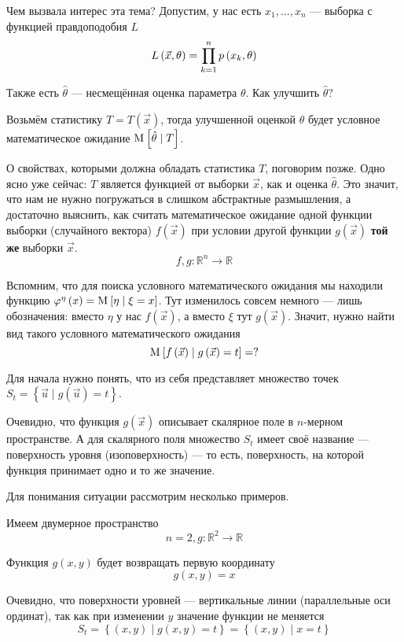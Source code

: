 Чем вызвала интерес эта тема?
Допустим, у нас есть $x_1, \dots, x_n$ --- выборка с функцией правдоподобия $L$
$$L\left( \vec{x}, \theta \right) = \prod_{k=1}^n p\left(x_k, \theta\right)$$

Также есть $\hat{\theta}$ --- несмещённая оценка параметра $\theta$.
Как улучшить $\hat{\theta}$?

Возьмём статистику $T = T\left( \vec{x} \right)$,
тогда улучшенной оценкой $\theta$ будет условное математическое ожидание
$\mathrm{M}_{} \left[  \hat{\theta} \mid T  \right]$.

О свойствах, которыми должна обладать статистика $T$, поговорим позже.
Одно ясно уже сейчас: $T$ является функцией от выборки $\vec{x}$,
как и оценка $\hat{\theta}$.
Это значит, что нам не нужно погружаться в слишком абстрактные размышления,
а достаточно выяснить, как считать математическое ожидание
одной функции выборки (случайного вектора) $f\left( \vec{x} \right)$
при условии другой функции $g\left( \vec{x} \right)$
\textbf{той же} выборки $\vec{x}$.
$$f,g: \mathbb{R}^n \rightarrow \mathbb{R}$$

Вспомним, что для поиска условного математического ожидания
мы находили функцию
$\varphi^{\eta}\left( x \right) = \mathrm{M}_{} \left[  \eta \mid \xi = x  \right]$.
Тут изменилось совсем немного --- лишь обозначения:
вместо $\eta$ у нас $f\left( \vec{x} \right)$,
а вместо $\xi$ тут $g\left( \vec{x} \right)$.
Значит, нужно найти вид такого условного математического ожидания
$$\mathrm{M}_{} \left[ f\left( \vec{x} \right) \mid g\left( \vec{x} \right) = t \right] = ?$$

Для начала нужно понять, что из себя представляет множество точек
$S_t = \left\{ \vec{u} \mid g\left( \vec{u} \right) = t \right\}$.

Очевидно, что функция $g\left( \vec{x} \right)$
описывает скалярное поле в $n$-мерном пространстве.
А для скалярного поля множество $S_t$
имеет своё название --- поверхность уровня (изоповерхность) --- то есть,
поверхность, на которой функция принимает одно и то же значение.

Для понимания ситуации рассмотрим несколько примеров.

\begin{example}
    Имеем двумерное пространство
    $$n=2, g: \mathbb{R}^2 \rightarrow \mathbb{R}$$

    Функция $g\left( x, y \right)$ будет возвращать первую координату
    $$g\left( x, y \right) = x$$

    Очевидно, что поверхности уровней --- вертикальные линии
    (параллельные оси ординат), так как при изменении $y$
    значение функции не меняется
    $$S_t
        = \left\{ \left( x, y \right) \mid g\left( x, y \right) = t \right\}
        = \left\{ \left( x, y \right) \mid x = t \right\}$$
\end{example}

